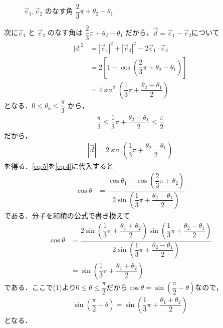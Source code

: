 \documentclass[../../main.tex]{subfiles}
\begin{document}
\begin{figure}[htb]
\begin{tikzpicture}[scale=1.75, >=stealth, every node/.style={font=\small}]
  \end{tikzpicture}
  \caption{$\vec{e}_1, \vec{e}_2$ のなす角 $\dfrac{2}{3}\pi + \theta_2 - \theta_1$}
  \label{fig:unit_vectors_angle_in_triangle}
\end{figure}

次に$\vec{e}_1$ と $\vec{e}_2$ のなす角は $\dfrac{2}{3}\pi + \theta_2 - \theta_1$ だから，$\vec{d}=\vec{e}_1-\vec{e}_2$について
\begin{align}
  |d|^2
  &= |\vec{e}_1|^2 + |\vec{e}_2|^2 - 2 \vec{e}_1 \cdot \vec{e}_2 \\
  &= 2\left[1 - \cos(\dfrac{2}{3}\pi + \theta_2 - \theta_1)\right] \\
  &= 4 \sin^2 (\dfrac{1}{3}\pi + \dfrac{\theta_2 - \theta_1}{2})
\end{align}
となる．$0 \le \theta_k \le \dfrac{\pi}{3}$ から，
\begin{align}
  \dfrac{\pi}{3} \le \dfrac{1}{3}\pi + \dfrac{\theta_2 - \theta_1}{2} \le \dfrac{\pi}{2}
\end{align}
だから，
\begin{align}
  |\vec{d}| = 2 \sin(\dfrac{1}{3}\pi + \dfrac{\theta_2 - \theta_1}{2}) \label{eq:5}
\end{align}
を得る．\cref{eq:5}を\cref{eq:4}に代入すると
\begin{align}
  \cos \theta
  &= \dfrac{\cos \theta_1 - \cos(\dfrac{2}{3}\pi + \theta_2)}{2 \sin(\dfrac{1}{3}\pi + \dfrac{\theta_2 - \theta_1}{2})}
\end{align}
である．分子を和積の公式で書き換えて
\begin{align}
  \cos\theta
  &= \dfrac{2 \sin(\dfrac{1}{3}\pi + \dfrac{\theta_1 + \theta_2}{2}) \sin(\dfrac{1}{3}\pi + \dfrac{\theta_2 - \theta_1}{2})}{2\sin(\dfrac{1}{3}\pi + \dfrac{\theta_2 - \theta_1}{2})} \\
  &= \sin(\dfrac{1}{3}\pi + \dfrac{\theta_1 + \theta_2}{2})
\end{align}
である．ここで(1)より$0 \le \theta \le \dfrac{\pi}{2}$だから$\cos\theta = \sin(\dfrac{\pi}{2} - \theta)$なので，
\begin{align}
  \sin(\dfrac{\pi}{2} - \theta) = \sin(\dfrac{1}{3}\pi + \dfrac{\theta_1 + \theta_2}{2})
\end{align}
となる．
\end{document}
